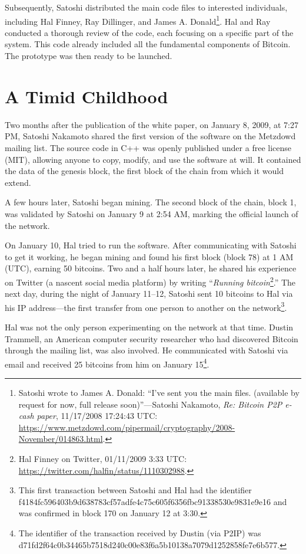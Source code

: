 \documentclass[
  a5paper,
  smalldemyvopaper,10pt,twoside,onecolumn,openright,extrafontsizes,hidelinks]{memoir}
\begin{document}
Subsequently, Satoshi distributed the main code files to interested
individuals, including Hal Finney, Ray Dillinger, and James A.
Donald\footnote{Satoshi wrote to James A. Donald: ``I've sent you the
  main files. (available by request for now, full release
  soon)''---Satoshi Nakamoto, \emph{Re: Bitcoin P2P e-cash paper},
  11/17/2008 17:24:43 UTC:
  \url{https://www.metzdowd.com/pipermail/cryptography/2008-November/014863.html}.}.
Hal and Ray conducted a thorough review of the code, each focusing on a
specific part of the system. This code already included all the
fundamental components of Bitcoin. The prototype was then ready to be
launched.

\section*{A Timid Childhood}\label{une-enfance-timide}


Two months after the publication of the white paper, on January 8, 2009,
at 7:27 PM, Satoshi Nakamoto shared the first version of the software on
the Metzdowd mailing list. The source code in C++ was openly published
under a free license (MIT), allowing anyone to copy, modify, and use the
software at will. It contained the data of the genesis block, the first
block of the chain from which it would extend.

A few hours later, Satoshi began mining. The second block of the chain,
block 1, was validated by Satoshi on January 9 at 2:54 AM, marking the
official launch of the network.

On January 10, Hal tried to run the software. After communicating with
Satoshi to get it working, he began mining and found his first block
(block 78) at 1 AM (UTC), earning 50 bitcoins. Two and a half hours
later, he shared his experience on Twitter (a nascent social media
platform) by writing ``\emph{Running bitcoin}\footnote{Hal Finney on
  Twitter, 01/11/2009 3:33 UTC:
  \url{https://twitter.com/halfin/status/1110302988}.}.'' The next day,
during the night of January 11--12, Satoshi sent 10 bitcoins to Hal via
his IP address---the first transfer from one person to another on the
network\footnote{This first transaction between Satoshi and Hal had the
  identifier
  f4184fc596403b9d638783cf57adfe4c75c605f6356fbc91338530e9831e9e16 and
  was confirmed in block 170 on January 12 at 3:30.}.

Hal was not the only person experimenting on the network at that time.
Dustin Trammell, an American computer security researcher who had
discovered Bitcoin through the mailing list, was also involved. He
communicated with Satoshi via email and received 25 bitcoins from him on
January 15\footnote{The identifier of the transaction received by Dustin
  (via P2IP) was
  d71fd2f64c0b34465b7518d240c00e83f6a5b10138a7079d1252858fe7e6b577.}.
\end{document}
